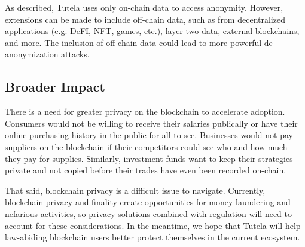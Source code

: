 As described, Tutela uses only on-chain data to access anonymity. However, extensions can be made to include off-chain data, such as from decentralized applications (e.g. DeFI, NFT, games, etc.), layer two data, external blockchains, and more. The inclusion of off-chain data could lead to more powerful de-anonymization attacks.

\subsection{Broader Impact}

There is a need for greater privacy on the blockchain to accelerate adoption. Consumers would not be willing to receive their salaries publically or have their online purchasing history in the public for all to see. Businesses would not pay suppliers on the blockchain if their competitors could see who and how much they pay for supplies. Similarly, investment funds want to keep their strategies private and not copied before their trades have even been recorded on-chain.

That said, blockchain privacy is a difficult issue to navigate. Currently, blockchain privacy and finality create opportunities for money laundering and nefarious activities, so privacy solutions combined with regulation will need to account for these considerations.
In the meantime, we hope that Tutela will help law-abiding blockchain users better protect themselves in the current ecosystem.